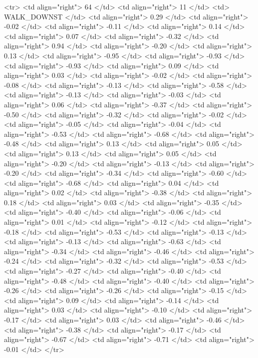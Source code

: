   <tr> <td align="right"> 64 </td> <td align="right">  11 </td> <td> WALK_DOWNST </td> <td align="right"> 0.29 </td> <td align="right"> -0.02 </td> <td align="right"> -0.11 </td> <td align="right"> 0.14 </td> <td align="right"> 0.07 </td> <td align="right"> -0.32 </td> <td align="right"> 0.94 </td> <td align="right"> -0.20 </td> <td align="right"> 0.13 </td> <td align="right"> -0.95 </td> <td align="right"> -0.93 </td> <td align="right"> -0.93 </td> <td align="right"> 0.09 </td> <td align="right"> 0.03 </td> <td align="right"> -0.02 </td> <td align="right"> -0.08 </td> <td align="right"> -0.13 </td> <td align="right"> -0.58 </td> <td align="right"> -0.13 </td> <td align="right"> -0.03 </td> <td align="right"> 0.06 </td> <td align="right"> -0.37 </td> <td align="right"> -0.50 </td> <td align="right"> -0.32 </td> <td align="right"> -0.02 </td> <td align="right"> -0.05 </td> <td align="right"> -0.04 </td> <td align="right"> -0.53 </td> <td align="right"> -0.68 </td> <td align="right"> -0.48 </td> <td align="right"> 0.13 </td> <td align="right"> 0.05 </td> <td align="right"> 0.13 </td> <td align="right"> 0.05 </td> <td align="right"> -0.20 </td> <td align="right"> -0.13 </td> <td align="right"> -0.20 </td> <td align="right"> -0.34 </td> <td align="right"> -0.60 </td> <td align="right"> -0.68 </td> <td align="right"> 0.04 </td> <td align="right"> 0.02 </td> <td align="right"> -0.38 </td> <td align="right"> 0.18 </td> <td align="right"> 0.03 </td> <td align="right"> -0.35 </td> <td align="right"> -0.40 </td> <td align="right"> -0.06 </td> <td align="right"> 0.01 </td> <td align="right"> -0.12 </td> <td align="right"> -0.18 </td> <td align="right"> -0.53 </td> <td align="right"> -0.13 </td> <td align="right"> -0.13 </td> <td align="right"> -0.63 </td> <td align="right"> -0.34 </td> <td align="right"> -0.46 </td> <td align="right"> -0.24 </td> <td align="right"> -0.32 </td> <td align="right"> -0.53 </td> <td align="right"> -0.27 </td> <td align="right"> -0.40 </td> <td align="right"> -0.48 </td> <td align="right"> -0.40 </td> <td align="right"> -0.26 </td> <td align="right"> -0.26 </td> <td align="right"> -0.15 </td> <td align="right"> 0.09 </td> <td align="right"> -0.14 </td> <td align="right"> 0.03 </td> <td align="right"> -0.10 </td> <td align="right"> -0.17 </td> <td align="right"> 0.03 </td> <td align="right"> -0.46 </td> <td align="right"> -0.38 </td> <td align="right"> -0.17 </td> <td align="right"> -0.67 </td> <td align="right"> -0.71 </td> <td align="right"> -0.01 </td> </tr>
